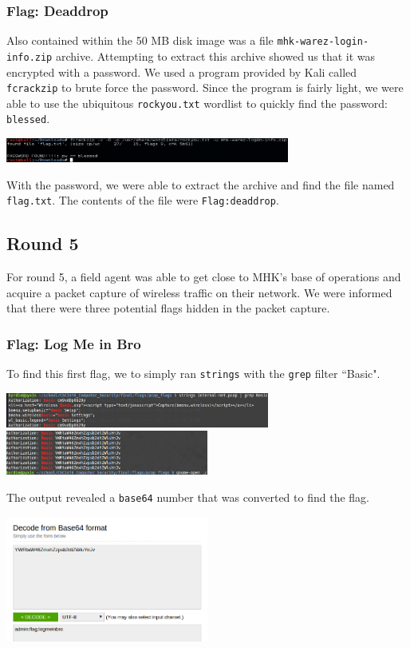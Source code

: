 \documentclass[10pt,a4paper,titlepage]{article}
\begin{document}
\subsubsection{Flag: Deaddrop}
Also contained within the 50 MB disk image was a file \texttt{mhk-warez-login-info.zip} archive. Attempting to extract this archive showed us that it was encrypted with a password. We used a program provided by Kali called \texttt{fcrackzip} to brute force the password. Since the program is fairly light, we were able to use the ubiquitous \texttt{rockyou.txt} wordlist to quickly find the password: \texttt{blessed}.
\begin{center}
\includegraphics[width=0.7\textwidth]{zip_flags/deaddrop/fcrack}
\end{center}
With the password, we were able to extract the archive and find the file named \texttt{flag.txt}. The contents of the file were \texttt{Flag:deaddrop}.
\subsection{Round 5}
For round 5, a field agent was able to get close to MHK's base of operations and acquire a packet capture of wireless traffic on their network. We were informed that there were three potential flags hidden in the packet capture.
\subsubsection{Flag: Log Me in Bro}
To find this first flag, we to simply ran \texttt{strings} with the \texttt{grep} filter ``Basic".
\begin{center}
\includegraphics[width=0.65\textwidth]{pcap_flags/logmeinbro/basic}
\includegraphics[width=0.5\textwidth]{pcap_flags/logmeinbro/base64}
\end{center}
The output revealed a \texttt{base64} number that was converted to find the flag.
\begin{center}
\includegraphics[width=0.5\textwidth]{pcap_flags/logmeinbro/flag}
\end{center}
\end{document}
